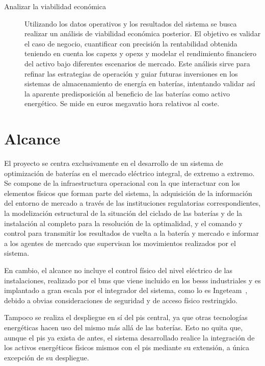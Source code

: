 \begin{description}
  \item[Analizar la viabilidad económica] Utilizando los datos operativos y los resultados del sistema se busca realizar un análisis de viabilidad económica posterior. El objetivo es validar el caso de negocio, cuantificar con precisión la rentabilidad obtenida teniendo en cuenta los \glspl{capex} y \glspl{opex} y modelar el rendimiento financiero del activo bajo diferentes escenarios de mercado. Este análisis sirve para refinar las estrategias de operación y guiar futuras inversiones en los sistemas de almacenamiento de energía en baterías, intentando validar así la aparente predisposición al beneficio de las baterías como activo energético. Se mide en euros megavatio hora relativos al coste.

\end{description}

\section{Alcance}%
\label{makereference1.2}

El proyecto se centra exclusivamente en el desarrollo de un sistema de optimización de baterías en el mercado eléctrico integral, de extremo a extremo. Se compone de la infraestructura operacional con la que interactuar con los elementos físicos que forman parte del sistema, la adquisición de la información del entorno de mercado a través de las instituciones regulatorias correspondientes, la modelización estructural de la situación del ciclado de las baterías y de la instalación al completo para la resolución de la optimalidad, y el comando y control para transmitir los resultados de vuelta a la batería y mercado e informar a los agentes de mercado que supervisan los movimientos realizados por el sistema.

En cambio, el alcance no incluye el control físico del nivel eléctrico de las instalaciones, realizado por el \gls{bms} que viene incluido en los \glspl{bess} industriales y es implantado a gran escala por el integrador del sistema, como lo es Ingeteam~\cite{ingeteam2022ingeteam}, debido a obvias consideraciones de seguridad y de acceso físico restringido.

Tampoco se realiza el despliegue en sí del \gls{pis} central, ya que otras tecnologías energéticas hacen uso del mismo más allá de las baterías. Esto no quita que, aunque el \gls{pis} ya exista de antes, el sistema desarrollado realice la integración de los activos energéticos físicos mismos con el \gls{pis} mediante su extensión, a única excepción de su despliegue.

